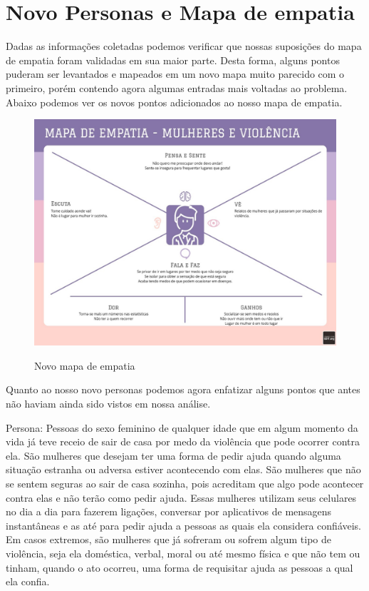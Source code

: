 \section{Novo Personas e Mapa de empatia}
Dadas as informações coletadas podemos verificar que nossas suposições do mapa de empatia foram validadas em sua maior parte. Desta forma, alguns pontos puderam ser levantados e mapeados em um novo mapa muito parecido com o primeiro, porém contendo agora algumas entradas mais voltadas ao problema. Abaixo podemos ver os novos pontos adicionados ao nosso mapa de empatia.
\begin{figure}[h]
  \begin{center}
  \includegraphics[width=1.0\linewidth]{images/mapa-empatia-novo.jpeg}\\
  \end{center}
  \caption[Nobo mapa de mepatia]{Novo mapa de empatia}
  \label{fig:novo-mapa-empatia}
\end{figure}

Quanto ao nosso novo personas podemos agora enfatizar alguns pontos que antes não haviam ainda sido vistos em nossa análise.

Persona: Pessoas do sexo feminino de qualquer idade que em algum momento da vida já teve receio de sair de casa por medo da violência que pode ocorrer contra ela. São mulheres que desejam ter uma forma de pedir ajuda quando alguma situação estranha ou adversa estiver acontecendo com elas. São mulheres que não se sentem seguras ao sair de casa sozinha, pois acreditam que algo pode acontecer contra elas e não terão como pedir ajuda. Essas mulheres utilizam seus celulares no dia a dia para fazerem ligações, conversar por aplicativos de mensagens instantâneas e as até para pedir ajuda a pessoas as quais ela considera confiáveis. Em casos extremos, são mulheres que já sofreram ou sofrem algum tipo de violência, seja ela doméstica, verbal, moral ou até mesmo física e que não tem ou tinham, quando o ato ocorreu, uma forma de requisitar ajuda as pessoas a qual ela confia.
